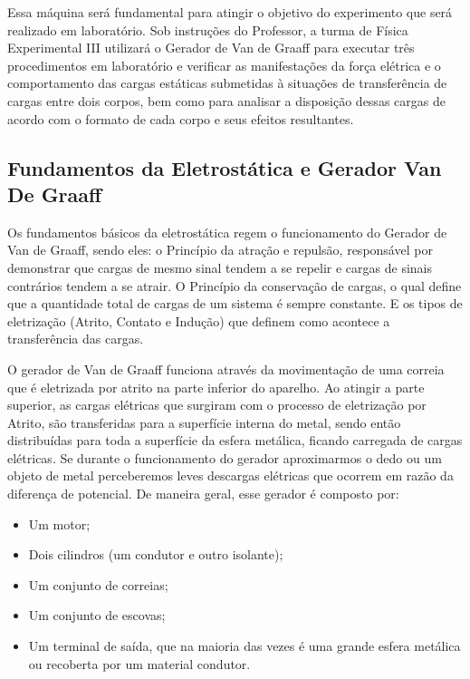 \noindent Essa máquina será fundamental para atingir o objetivo do experimento que será realizado em 
laboratório. Sob instruções do Professor, a turma de Física Experimental III
utilizará o Gerador de Van de Graaff para executar três procedimentos em laboratório e 
verificar as manifestações da força elétrica e o comportamento das cargas estáticas submetidas à 
situações de transferência de cargas entre dois corpos, bem como para analisar a disposição dessas 
cargas de acordo com o formato de cada corpo e seus efeitos resultantes.

\subsection*{Fundamentos da Eletrostática e Gerador Van De Graaff}
Os fundamentos básicos da eletrostática regem o funcionamento do Gerador de Van de Graaff, 
sendo eles: o Princípio da atração e repulsão, responsável por demonstrar que cargas de mesmo 
sinal tendem a se repelir e cargas de sinais contrários tendem a se atrair. O Princípio da conservação 
de cargas, o qual define que a quantidade total de cargas de um sistema é sempre constante. E os 
tipos de eletrização (Atrito, Contato e Indução) que definem como acontece a transferência das 
cargas.

\noindent O gerador de Van de Graaff funciona através da movimentação de uma correia que é eletrizada por 
atrito na parte inferior do aparelho. Ao atingir a parte superior, as cargas elétricas que surgiram com 
o processo de eletrização por Atrito, são transferidas para a superfície interna do metal, sendo então 
distribuídas para toda a superfície da esfera metálica, ficando carregada de cargas elétricas. Se 
durante o funcionamento do gerador aproximarmos o dedo ou um objeto de metal perceberemos 
leves descargas elétricas que ocorrem em razão da diferença de potencial. 
De maneira geral, esse gerador é composto por:

\begin{itemize}
    \item  Um motor; 
    \item  Dois cilindros (um condutor e outro isolante); 
    \item  Um conjunto de correias; 
    \item  Um conjunto de escovas; 
    \item  Um terminal de saída, que na maioria das vezes é uma grande esfera metálica ou recoberta por um material condutor.
\end{itemize}

